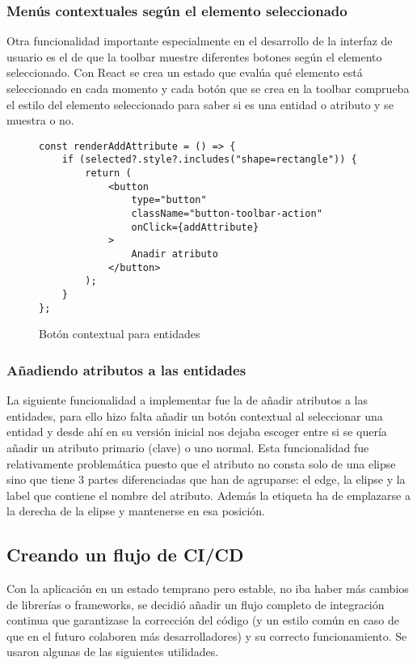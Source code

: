\subsubsection{Menús contextuales según el elemento seleccionado}
Otra funcionalidad importante especialmente en el desarrollo de la interfaz de usuario es el de que la toolbar muestre diferentes botones según el elemento seleccionado.
Con React se crea un estado que evalúa qué elemento está seleccionado en cada momento y cada botón que se crea en la toolbar comprueba el estilo del elemento seleccionado para saber si es una entidad o atributo y se muestra o no.

\begin{figure}[h]
\lstset{breaklines=true, basicstyle=\footnotesize}
\begin{lstlisting}[frame=single]
const renderAddAttribute = () => {
    if (selected?.style?.includes("shape=rectangle")) {
        return (
            <button
                type="button"
                className="button-toolbar-action"
                onClick={addAttribute}
            >
                Anadir atributo
            </button>
        );
    }
};
\end{lstlisting}
\caption{Botón contextual para entidades}
\end{figure}


\subsubsection{Añadiendo atributos a las entidades}
La siguiente funcionalidad a implementar fue la de añadir atributos a las entidades, para ello hizo falta añadir un botón contextual al seleccionar una entidad y desde ahí en su versión inicial nos dejaba escoger entre si se quería añadir un atributo primario (clave) o uno normal.
Esta funcionalidad fue relativamente problemática puesto que el atributo no consta solo de una elipse sino que tiene 3 partes diferenciadas que han de agruparse: el edge, la elipse y la label que contiene el nombre del atributo.
Además la etiqueta ha de emplazarse a la derecha de la elipse y mantenerse en esa posición.


\subsection{Creando un flujo de CI/CD}
Con la aplicación en un estado temprano pero estable, no iba haber más cambios de librerías o frameworks, se decidió añadir un flujo completo de integración continua que garantizase la corrección del código (y un estilo común en caso de que en el futuro colaboren más desarrolladores) y su correcto funcionamiento.
Se usaron algunas de las siguientes utilidades.

